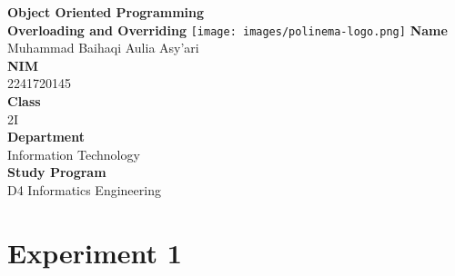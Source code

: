 \documentclass[12pt,titlepage]{article}
\newcommand{\vSubject}{Object Oriented Programming}
\newcommand{\vSubtitle}{Overloading and Overriding}
\newcommand{\vName}{Muhammad Baihaqi Aulia Asy'ari}
\newcommand{\vNIM}{2241720145}
\newcommand{\vClass}{2I}
\newcommand{\vDepartment}{Information Technology}
\newcommand{\vStudyProgram}{D4 Informatics Engineering}
\begin{document}
\begin{titlepage}
    \centering
    \vfill
    {\bfseries\LARGE
        \vSubject\\
        \vskip0.25cm
        \vSubtitle
    }
    \vfill
    \texttt{[image: images/polinema-logo.png]}
    \vfill
    {
        \textbf{Name}\\
        \vName\\
        \vskip0.5cm
        \textbf{NIM}\\
        \vNIM\\
        \vskip0.5cm
        \textbf{Class}\\
        \vClass\\
        \vskip0.5cm
        \textbf{Department}\\
        \vDepartment\\
        \vskip0.5cm
        \textbf{Study Program}\\
        \vStudyProgram
    }
\end{titlepage}

\newpage

\section{Experiment 1}
\end{document}

